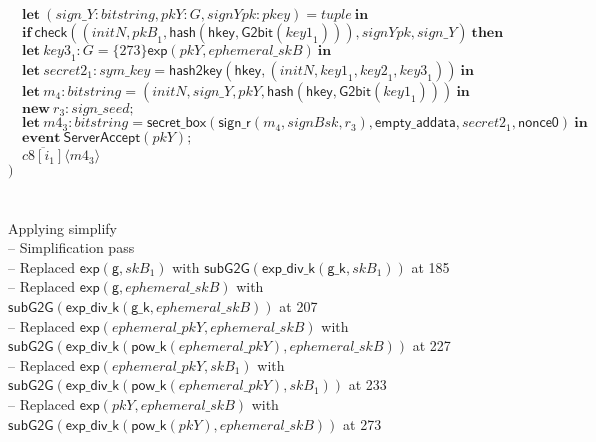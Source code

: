 \documentclass{article}
\newcommand{\coutput}[2]{\overline{#1}\langle{#2}\rangle}
\newcommand{\kw}[1]{\mathbf{#1}}
\newcommand{\kwf}[1]{\mathsf{#1}}
\newcommand{\var}[1]{\mathit{#1}}
\newcommand{\kwt}[1]{\mathit{#1}}
\newcommand{\kwc}[1]{\mathit{#1}}
\begin{document}
\begin{tabbing}
\>$\quad \kw{let}\ \kwf{}(\var{sign{\_}Y}: \kwt{bitstring}, \var{pkY}: \kwt{G}, \var{signYpk}: \kwt{pkey}) = \var{tuple}\ \kw{in}$\\
\>$\quad \kw{if}\ \kwf{check}(\kwf{}(\var{initN}, \var{pkB}_{1}, \kwf{hash}(\kwf{hkey}, \kwf{G2bit}(\var{key1}_{1}))), \var{signYpk}, \var{sign{\_}Y})\ \kw{then}$\\
\>$\quad \kw{let}\ \var{key3}_{1}: \kwt{G} = \{273\}\kwf{exp}(\var{pkY}, \var{ephemeral{\_}skB})\ \kw{in}$\\
\>$\quad \kw{let}\ \var{secret2}_{1}: \kwt{sym{\_}key} = \kwf{hash2key}(\kwf{hkey}, \kwf{}(\var{initN}, \var{key1}_{1}, \var{key2}_{1}, \var{key3}_{1}))\ \kw{in}$\\
\>$\quad \kw{let}\ \var{m}_{4}: \kwt{bitstring} = \kwf{}(\var{initN}, \var{sign{\_}Y}, \var{pkY}, \kwf{hash}(\kwf{hkey}, \kwf{G2bit}(\var{key1}_{1})))\ \kw{in}$\\
\>$\quad \kw{new}\ \var{r}_{3}: \kwt{sign{\_}seed};$\\
\>$\quad \kw{let}\ \var{m4}_{3}: \kwt{bitstring} = \kwf{secret{\_}box}(\kwf{sign{\_}r}(\var{m}_{4}, \var{signBsk}, \var{r}_{3}), \kwf{empty{\_}addata}, \var{secret2}_{1}, \kwf{nonce0})\ \kw{in}$\\
\>$\quad \kw{event}\ \kwf{ServerAccept}(\var{pkY});$\\
\>$\quad \coutput{\kwc{c8}[\var{i}_{1}]}{\var{m4}_{3}}$\\
\>$)$\\
\\
\\
Applying simplify\\
\quad -- Simplification pass\\
\qquad -- Replaced $\kwf{exp}(\kwf{g}, \var{skB}_{1})$ with $\kwf{subG2G}(\kwf{exp{\_}div{\_}k}(\kwf{g{\_}k}, \var{skB}_{1}))$ at 185\\
\qquad -- Replaced $\kwf{exp}(\kwf{g}, \var{ephemeral{\_}skB})$ with $\kwf{subG2G}(\kwf{exp{\_}div{\_}k}(\kwf{g{\_}k}, \var{ephemeral{\_}skB}))$ at 207\\
\qquad -- Replaced $\kwf{exp}(\var{ephemeral{\_}pkY}, \var{ephemeral{\_}skB})$ with $\kwf{subG2G}(\kwf{exp{\_}div{\_}k}(\kwf{pow{\_}k}(\var{ephemeral{\_}pkY}), \var{ephemeral{\_}skB}))$ at 227\\
\qquad -- Replaced $\kwf{exp}(\var{ephemeral{\_}pkY}, \var{skB}_{1})$ with $\kwf{subG2G}(\kwf{exp{\_}div{\_}k}(\kwf{pow{\_}k}(\var{ephemeral{\_}pkY}), \var{skB}_{1}))$ at 233\\
\qquad -- Replaced $\kwf{exp}(\var{pkY}, \var{ephemeral{\_}skB})$ with $\kwf{subG2G}(\kwf{exp{\_}div{\_}k}(\kwf{pow{\_}k}(\var{pkY}), \var{ephemeral{\_}skB}))$ at 273\\

\end{tabbing}
\end{document}

